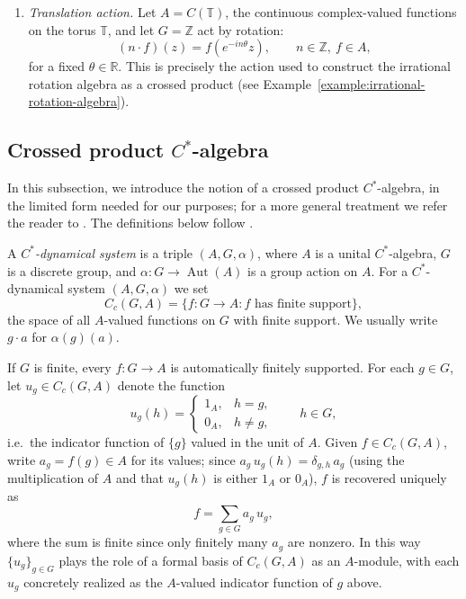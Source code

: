 \begin{example}
\begin{enumerate}
        \item \emph{Translation action.} Let \( A = C(\mathbb{T}) \), the
            continuous complex-valued functions on the torus \(
            \mathbb{T} \), and let
            \( G = \mathbb{Z} \) act by rotation:
            \[
                (n \cdot f)(z) = f(e^{-in \theta}z), \qquad n \in
                \mathbb{Z},\ f \in A,
            \]
            for a fixed \( \theta \in \mathbb{R} \). This is precisely the
            action used to construct the irrational rotation algebra as a
            crossed product (see
            Example~\ref{example:irrational-rotation-algebra}).
    \end{enumerate}
\end{example}

\subsection{Crossed product \(C^{*}\)-algebra}
\label{subsec:crossed-product-cstar}

In this subsection, we introduce the notion of a crossed product
\( C^{*} \)-algebra, in the limited form needed for our purposes; for a
more general treatment we refer the reader to \textcite{blackadar}. The
definitions below follow \textcite{blackadar}.

\begin{definition}
    \label{def:cstar-dynamical-system}
    A \emph{\( C^{*} \)-dynamical system} is a triple \( (A, G, \alpha) \),
    where \( A \) is a unital \( C^{*} \)-algebra, \( G \) is a discrete group,
    and \( \alpha \colon G \to \operatorname{Aut}(A) \) is a group action
    on \( A \). For a \( C^{*} \)-dynamical system \( (A,G,\alpha) \) we set
    \[
        C_c(G,A) = \{ f \colon G \to A : f \text{ has finite support} \},
    \]
    the space of all \( A \)-valued functions on \( G \) with finite
    support. We usually write \( g \cdot a \) for \( \alpha(g)(a) \).
\end{definition}

If \( G \) is finite, every \( f \colon G \to A \) is automatically
finitely supported. For each \( g \in G \), let
\( u_g \in C_c(G,A) \) denote the function
\[
    u_g(h) =
    \begin{cases}
        1_A, & h = g, \\
        0_A, & h \neq g,
    \end{cases}
    \qquad h \in G,
\]
i.e.\ the indicator function of \( \{g\} \) valued in the unit of
\( A \). Given \( f \in C_c(G,A) \), write \( a_g = f(g) \in A \)
for its values; since \( a_g\, u_g(h) = \delta_{g,h}\,a_g \) (using the
    multiplication of \( A \) and that \( u_g(h) \) is either \( 1_A \) or
\( 0_A \)), \( f \) is recovered uniquely as
\[
    f = \sum_{g \in G} a_g\, u_g,
\]
where the sum is finite since only finitely many \( a_g \) are
nonzero. In this way \( \{u_g\}_{g \in G} \) plays the role of a
formal basis of \( C_c(G,A) \) as an \( A \)-module, with each
\( u_g \) concretely realized as the \( A \)-valued indicator function
of \( g \) above.

